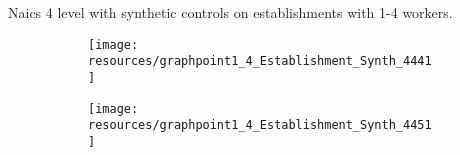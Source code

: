 \documentclass[12pt]{article}
\begin{document}
\pagebreak

Naics 4 level with synthetic controls on establishments with 1-4 workers.

\begin{center}
	\centering
	
\end{center}
\begin{center}
	\centering
	
\end{center}
\begin{center}
	\centering
	
\end{center}
\begin{center}
	\centering
	
\end{center}
\begin{center}
	\centering
	
\end{center}
\begin{center}
	\centering
	
\end{center}
\begin{center}
	\centering
	
\end{center}
\begin{center}
	\centering
	
\end{center}
\begin{center}
	\centering
	
\end{center}
\begin{center}
	\centering
	
\end{center}
\begin{center}
	\centering
	
\end{center}
\begin{center}
	\centering
	
\end{center}

\begin{figure}[H]
	\centering
	\begin{subfigure}[b]{0.4\textwidth}
	    \texttt{[image: resources/graphpoint1\_4\_Establishment\_Synth\_4441]}
	\end{subfigure}
	\begin{subfigure}[b]{0.4\textwidth}
	    \texttt{[image: resources/graphpoint1\_4\_Establishment\_Synth\_4451]}
	\end{subfigure}
\end{figure}
\end{document}
